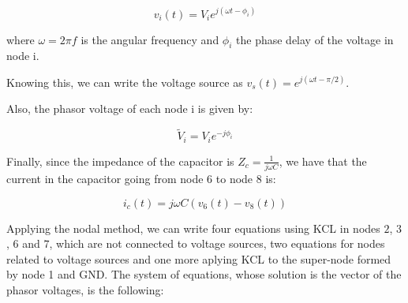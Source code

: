 \begin{equation}
  v_i(t) = V_i e^{j(\omega t - \phi_i)}
\end{equation}

where $\omega = 2\pi f$ is the angular frequency and $\phi_i$ the phase delay of the voltage in node i. 

Knowing this, we can write the voltage source as $v_s(t) = e^{j(\omega t - \pi/2)}$.
 
Also, the phasor voltage of each node i is given by:

\begin{equation}
  \widetilde{V}_i = V_i e^{-j\phi_i}
\end{equation}

Finally, since the impedance of the capacitor is $Z_c = \frac{1}{j \omega C}$, we have that the current in the capacitor going from node 6 to node 8 is:

\begin{equation}
  i_c(t) = j \omega C (v_6(t)-v_8(t))
\end{equation}

Applying the nodal method, we can write four equations using KCL in nodes $2$, $3$, $6$ and $7$, which are not connected to voltage sources, two equations for nodes related to voltage sources and one more aplying KCL to the super-node formed by node 1 and GND. The system of equations, whose solution is the vector of the phasor voltages, is the following:

